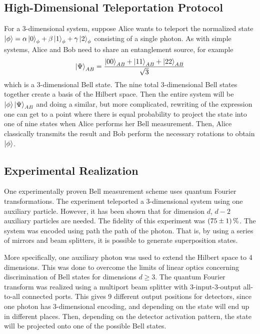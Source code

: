 \subsection{High-Dimensional Teleportation Protocol}
For a 3-dimensional system, suppose Alice wants to teleport the normalized state $\ket{\phi} = \alpha \ket{0}_\phi + \beta \ket{1}_\phi + \gamma \ket{2}_\phi$ consisting of a single photon. As with simple systems, Alice and Bob need to share an entanglement source, for example 
\begin{equation}
    \ket{\Psi}_{AB} = \frac{\ket{00}_{AB} + \ket{11}_{AB} + \ket{22}_{AB}}{\sqrt{3}}
\end{equation}
which is a 3-dimensional Bell state. The nine total 3-dimensional Bell states together create a basis of the Hilbert space. Then the entire system will be $\ket{\phi}\ket{\Psi}_{AB}$ and doing a similar, but more complicated, rewriting of the expression one can get to a point where there is equal probability to project the state into one of nine states when Alice performs her Bell measurement. Then, Alice classically transmits the result and Bob perform the necessary rotations to obtain $\ket{\phi}$. \cite{Luo:2019}

\subsection{Experimental Realization}
One experimentally proven Bell measurement scheme uses quantum Fourier transformations. The experiment teleported a 3-dimensional system using one auxiliary particle. However, it has been shown that for dimension $d$, $d-2$ auxiliary particles are needed. The fidelity of this experiment was $\SI{75\pm 1}{\percent}$. The system was encoded using path the path of the photon. That is, by using a series of mirrors and beam splitters, it is possible to generate superposition states. \cite{Luo:2019}

More specifically, one auxiliary photon was used to extend the Hilbert space to 4 dimensions. This was done to overcome the limits of linear optics concerning discrimination of Bell states for dimensions $d \geq 3$. The quantum Fourier transform was realized using a multiport beam splitter with 3-input-3-output all-to-all connected ports. This gives 9 different output positions for detectors, since one photon has 3-dimensional encoding, and depending on the state will end up in different places. Then, depending on the detector activation pattern, the state will be projected onto one of the possible Bell states. \cite{Luo:2019}